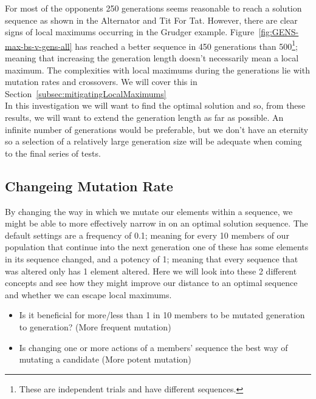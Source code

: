 For most of the opponents 250 generations seems reasonable to reach a solution sequence as shown in the Alternator and Tit For Tat.
However, there are clear signs of local maximums occurring in the Grudger example.
Figure~\ref{fig:GENS-max-bs-v-gens-all} has reached a better sequence in 450 generations than 500\footnote{These are independent trials and have different sequences.}; meaning that increasing the generation length doesn't necessarily mean a local maximum.
The complexities with local maximums during the generations lie with mutation rates and crossovers.
We will cover this in Section~\ref{subsec:mitigatingLocalMaximums}\\

In this investigation we will want to find the optimal solution and so, from these results, we will want to extend the generation length as far as possible.
An infinite number of generations would be preferable, but we don't have an eternity so a selection of a relatively large generation size will be adequate when coming to the final series of tests.\\

\subsection{Changeing Mutation Rate}\label{subsec:changeingMutationRate}
By changing the way in which we mutate our elements within a sequence, we might be able to more effectively narrow in on an optimal solution sequence.
The default settings are a frequency of 0.1; meaning for every 10 members of our population that continue into the next generation one of these has some elements in its sequence changed, and a potency of 1;
meaning that every sequence that was altered only has 1 element altered.
Here we will look into these 2 different concepts and see how they might improve our distance to an optimal sequence and whether we can escape local maximums.
\begin{itemize}
    \item Is it beneficial for more/less than 1 in 10 members to be mutated generation to generation? (More frequent
mutation)
    \item Is changing one or more actions of a members' sequence the best way of mutating a candidate (More potent mutation)
\end{itemize}

